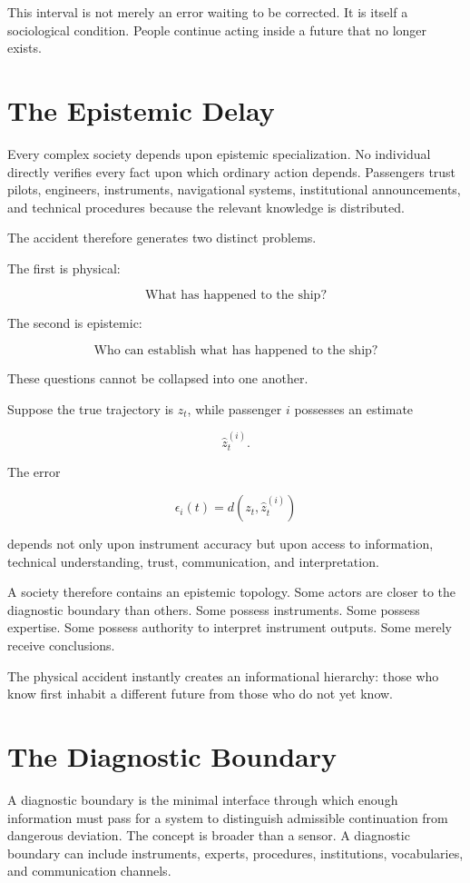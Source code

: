 \documentclass[11pt,oneside]{book}
\theoremstyle{definition}
\theoremstyle{remark}
\begin{document}
This interval is not merely an error waiting to be corrected. It is itself a sociological condition. People continue acting inside a future that no longer exists.

\section{The Epistemic Delay}

Every complex society depends upon epistemic specialization. No individual directly verifies every fact upon which ordinary action depends. Passengers trust pilots, engineers, instruments, navigational systems, institutional announcements, and technical procedures because the relevant knowledge is distributed.

The accident therefore generates two distinct problems.

The first is physical:

\[
\text{What has happened to the ship?}
\]

The second is epistemic:

\[
\text{Who can establish what has happened to the ship?}
\]

These questions cannot be collapsed into one another.

Suppose the true trajectory is \(z_t\), while passenger \(i\) possesses an estimate

\[
\hat z_t^{(i)}.
\]

The error

\[
\epsilon_i(t)
=
d\!\left(
z_t,
\hat z_t^{(i)}
\right)
\]

depends not only upon instrument accuracy but upon access to information, technical understanding, trust, communication, and interpretation.

A society therefore contains an epistemic topology. Some actors are closer to the diagnostic boundary than others. Some possess instruments. Some possess expertise. Some possess authority to interpret instrument outputs. Some merely receive conclusions.

The physical accident instantly creates an informational hierarchy: those who know first inhabit a different future from those who do not yet know.

\section{The Diagnostic Boundary}

A diagnostic boundary is the minimal interface through which enough information must pass for a system to distinguish admissible continuation from dangerous deviation. The concept is broader than a sensor. A diagnostic boundary can include instruments, experts, procedures, institutions, vocabularies, and communication channels.
\end{document}
